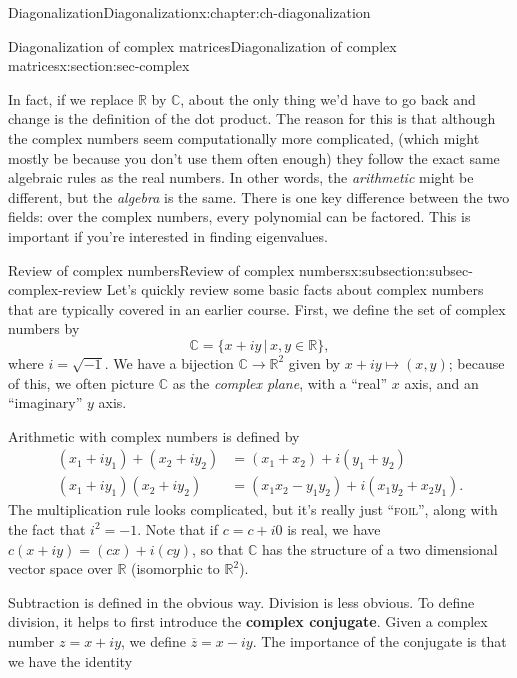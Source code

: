 \documentclass[oneside,10pt,]{book}
\newcommand{\initialism}[1]{\textsc{\MakeLowercase{#1}}}
\newcommand{\terminology}[1]{\textbf{#1}}
\numberwithin{equation}{section}
\newcommand{\R}{\mathbb{R}}
\newcommand{\C}{\mathbb{C}}
\newcommand{\amp}{&}
\begin{document}
\begin{chapterptx}{Diagonalization}{}{Diagonalization}{}{}{x:chapter:ch-diagonalization}
\begin{sectionptx}{Diagonalization of complex matrices}{}{Diagonalization of complex matrices}{}{}{x:section:sec-complex}
\begin{introduction}{}
\par
In fact, if we replace \(\R\) by \(\C\), about the only thing we'd have to go back and change is the definition of the dot product. The reason for this is that although the complex numbers seem computationally more complicated, (which might mostly be because you don't use them often enough) they follow the exact same algebraic rules as the real numbers. In other words, the \emph{arithmetic} might be different, but the \emph{algebra} is the same. There is one key difference between the two fields: over the complex numbers, every polynomial can be factored. This is important if you're interested in finding eigenvalues.%
\end{introduction}%
%
%
\typeout{************************************************}
\typeout{************************************************}
%
\begin{subsectionptx}{Review of complex numbers}{}{Review of complex numbers}{}{}{x:subsection:subsec-complex-review}
Let's quickly review some basic facts about complex numbers that are typically covered in an earlier course. First, we define the set of complex numbers by%
\begin{equation*}
\C = \{x+iy \,|\, x,y\in \R\},
\end{equation*}
where \(i=\sqrt{-1}\). We have a bijection \(\C \to \R^2\) given by \(x+iy\mapsto (x,y)\); because of this, we often picture \(\C\) as the \emph{complex plane}, with a ``real'' \(x\) axis, and an ``imaginary'' \(y\) axis.%
\par
Arithmetic with complex numbers is defined by%
\begin{align*}
(x_1+iy_1)+(x_2+iy_2) \amp = (x_1+x_2)+i(y_1+y_2) \\
(x_1+iy_1)(x_2+iy_2) \amp = (x_1x_2-y_1y_2)+i(x_1y_2+x_2y_1)\text{.}
\end{align*}
The multiplication rule looks complicated, but it's really just ``\initialism{FOIL}'', along with the fact that \(i^2=-1\). Note that if \(c=c+i0\) is real, we have \(c(x+iy)=(cx)+i(cy)\), so that \(\C\) has the structure of a two dimensional vector space over \(\R\) (isomorphic to \(\R^2\)).%
\par
Subtraction is defined in the obvious way. Division is less obvious. To define division, it helps to first introduce the \terminology{complex conjugate}. Given a complex number \(z=x+iy\), we define \(\overline{z}=x-iy\). The importance of the conjugate is that we have the identity%
\begin{equation*}

\end{equation*}
\end{subsectionptx}
\end{sectionptx}
\end{chapterptx}
\end{document}
